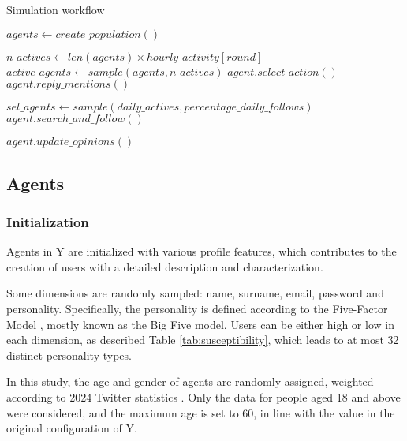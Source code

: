 \begin{algorithm}
\caption{Simulation workflow}
\label{alg:workflow}
\begin{algorithmic}[1]
\STATE $agents \gets create\_population()$

        \STATE $n\_actives \gets len(agents) \times hourly\_activity[round]$
        \STATE $active\_agents \gets sample(agents, n\_actives)$ 
            \STATE $agent.select\_action()$
            \STATE $agent.reply\_mentions()$
        \ENDFOR
    \ENDFOR

    \STATE $sel\_agents \gets sample(daily\_actives, percentage\_daily\_follows)$
        \STATE $agent.search\_and\_follow()$
    \ENDFOR

        \STATE $agent.update\_opinions()$
    \ENDFOR

\ENDFOR
\end{algorithmic}
\end{algorithm}



\subsection{Agents}

\subsubsection{Initialization}
Agents in Y are initialized with various profile features, which contributes to the creation of users with a detailed description and characterization.

Some dimensions are randomly sampled: name, surname, email, password and personality.
Specifically, the personality is defined according to the Five-Factor Model \cite{McCrae1992}, mostly known as the Big Five model. 
Users can be either high or low in each dimension, as described Table \ref{tab:susceptibility}, which leads to at most 32 distinct personality types.

\medskip
In this study, the age and gender of agents are randomly assigned, weighted according to 2024 Twitter statistics \cite{statista2024twitter}. Only the data for people aged 18 and above were considered, and the maximum age is set to 60, in line with the value in the original configuration of Y.

